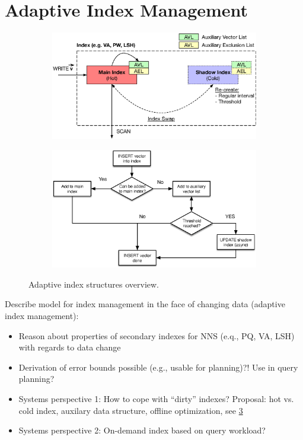 \section{Adaptive Index Management}

\begin{figure}[h!]
    \centering
    \begin{subfigure}[b]{0.40\textwidth}
        \centering
        \includegraphics[width=\textwidth]{figures/adaptive_index.eps}
        \label{fig:adaptive_index:architecture}
    \end{subfigure}
    \hfill
    \begin{subfigure}[b]{0.40\textwidth}
        \centering
        \includegraphics[width=\textwidth]{figures/adaptive_index_flow.eps}
        \label{fig:adaptive_index:flow}
    \end{subfigure}
    \caption{Adaptive index structures overview.}
    \label{fig:adaptive_index}
\end{figure}

Describe model for index management in the face of changing data (adaptive index management):

\begin{itemize}
    \item Reason about properties of secondary indexes for NNS (e.q., PQ, VA, LSH) with regards to data change
    \item Derivation of error bounds possible (e.g., usable for planning)?! Use in query planning?
    \item Systems perspective 1: How to cope with ``dirty'' indexes? Proposal: hot vs. cold index, auxilary data structure, offline optimization, see \cref{fig:adaptive_index}
    \item Systems perspective 2: On-demand index based on query workload?
\end{itemize}

